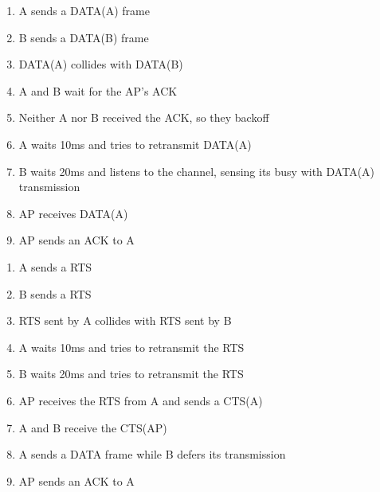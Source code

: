 \begin{questions}
    \begin{solution}
        \begin{enumerate}
            \item A sends a DATA(A) frame
            \item B sends a DATA(B) frame
            \item DATA(A) collides with DATA(B)
            \item A and B wait for the AP's ACK
            \item Neither A nor B received the ACK, so they backoff
            \item A waits 10ms and tries to retransmit DATA(A)
            \item B waits 20ms and listens to the channel, sensing its busy with DATA(A) transmission
            \item AP receives DATA(A)
            \item AP sends an ACK to A
        \end{enumerate}
    \end{solution}

    \begin{solution}
        \begin{enumerate}
            \item A sends a RTS
            \item B sends a RTS
            \item RTS sent by A collides with RTS sent by B
            \item A waits 10ms and tries to retransmit the RTS
            \item B waits 20ms and tries to retransmit the RTS
            \item AP receives the RTS from A and sends a CTS(A)
            \item A and B receive the CTS(AP)
            \item A sends a DATA frame while B defers its transmission
            \item AP sends an ACK to A
        \end{enumerate}
    \end{solution}


\end{questions}

